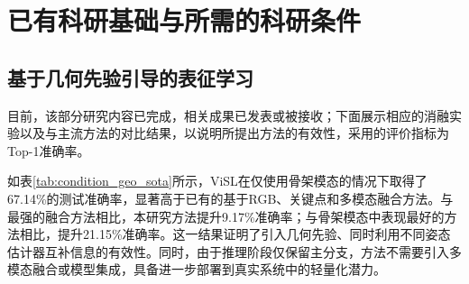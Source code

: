 ﻿\chapter{已有科研基础与所需的科研条件}

\section{基于几何先验引导的表征学习}

目前，该部分研究内容已完成，相关成果已发表或被接收\citep{peng2025synthetic,peng2026visl}；下面展示相应的消融实验以及与主流方法的对比结果，以说明所提出方法的有效性，采用的评价指标为Top-1准确率。

如表\ref{tab:condition_geo_sota}所示，ViSL在仅使用骨架模态的情况下取得了67.14\%的测试准确率，显著高于已有的基于RGB、关键点和多模态融合方法。与最强的融合方法相比，本研究方法提升9.17\%准确率；与骨架模态中表现最好的方法相比，提升21.15\%准确率。这一结果证明了引入几何先验、同时利用不同姿态估计器互补信息的有效性。同时，由于推理阶段仅保留主分支，方法不需要引入多模态融合或模型集成，具备进一步部署到真实系统中的轻量化潜力。

